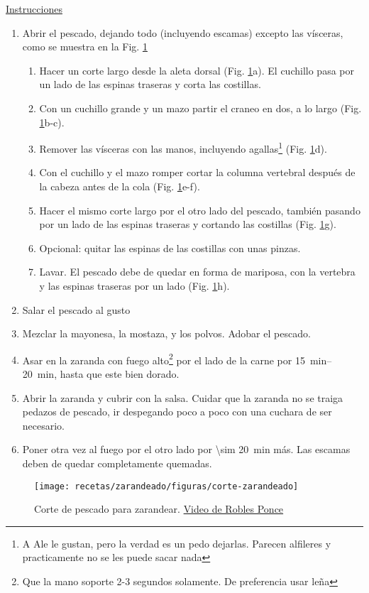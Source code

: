 \underline{Instrucciones}
\begin{enumerate}
\item Abrir el pescado, dejando todo (incluyendo escamas) excepto las vísceras, como se muestra en la Fig. \ref{fig:corte-zarandeado}
\begin{enumerate}
\item Hacer un corte largo desde la aleta dorsal (Fig. \ref{fig:corte-zarandeado}a). El cuchillo pasa por un lado de las espinas traseras y corta las costillas.
\item Con un cuchillo grande y un mazo partir el craneo en dos, a lo largo (Fig. \ref{fig:corte-zarandeado}b-c).
\item Remover las vísceras con las manos, incluyendo agallas\footnote{A Ale le gustan, pero la verdad es un pedo dejarlas. Parecen alfileres y practicamente no se les puede sacar nada} (Fig. \ref{fig:corte-zarandeado}d).
\item Con el cuchillo y el mazo romper cortar la columna vertebral después de la cabeza antes de la cola (Fig. \ref{fig:corte-zarandeado}e-f).
\item Hacer el mismo corte largo por el otro lado del pescado, también pasando por un lado de las espinas traseras y cortando las costillas (Fig. \ref{fig:corte-zarandeado}g).
\item Opcional: quitar las espinas de las costillas con unas pinzas.
\item Lavar. El pescado debe de quedar en forma de mariposa, con la vertebra y las espinas traseras por un lado (Fig. \ref{fig:corte-zarandeado}h).
\end{enumerate}
\item Salar el pescado al gusto
\item Mezclar la mayonesa, la mostaza, y los polvos. Adobar el pescado.
\item Asar en la zaranda con fuego alto\footnote{Que la mano soporte 2-3 segundos solamente. De preferencia usar leña} por el lado de la carne por \SIrange{15}{20}{min}, hasta que este bien dorado.
\item Abrir la zaranda y cubrir con la salsa. Cuidar que la zaranda no se traiga pedazos de pescado, ir despegando poco a poco con una cuchara de ser necesario.
\item Poner otra vez al fuego por el otro lado por \SI{\sim 20}{min} más. Las escamas deben de quedar completamente quemadas.
\end{enumerate}

\begin{figure}
\texttt{[image: recetas/zarandeado/figuras/corte-zarandeado]}
\caption{Corte de pescado para zarandear. \href{https://www.youtube.com/watch?v=_OmdFQWyWRc}{Video de Robles Ponce}}
\label{fig:corte-zarandeado}
\end{figure}